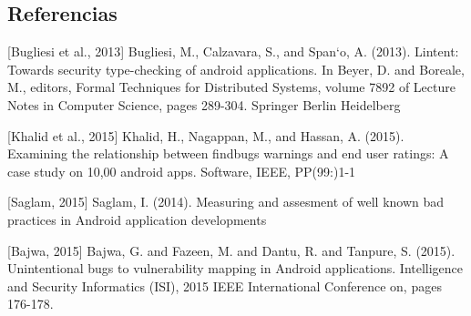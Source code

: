 \documentclass{beamer}
\begin{document}
    \subsection{Referencias}
    \frame
    {
        [Bugliesi et al., 2013] Bugliesi, M., Calzavara, S., and Span`o, A. (2013).
        Lintent: Towards security type-checking of android applications. In Beyer,
        D. and Boreale, M., editors, Formal Techniques for Distributed Systems,
        volume 7892 of Lecture Notes in Computer Science, pages 289-304. Springer
        Berlin Heidelberg

        [Khalid et al., 2015] Khalid, H., Nagappan, M., and Hassan, A. (2015).
        Examining the relationship between findbugs warnings and end user ratings:
        A case study on 10,00 android apps. Software, IEEE, PP(99:)1-1

        [Saglam, 2015] Saglam, I. (2014). Measuring and assesment of well known
        bad practices in Android application developments
        
        [Bajwa, 2015] Bajwa, G. and Fazeen, M. and Dantu, R. and Tanpure, S. (2015).
        Unintentional bugs to vulnerability mapping in Android applications. Intelligence
        and Security Informatics (ISI), 2015 IEEE International Conference on, pages 176-178. 
    
    }
\end{document}
